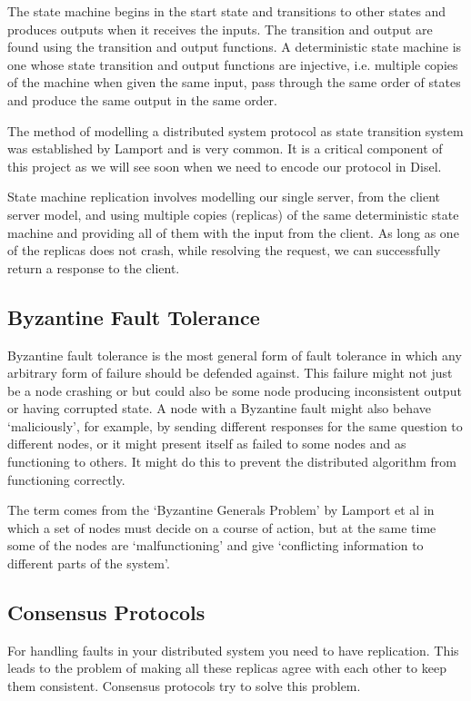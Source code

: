 The state machine begins in the start state and transitions to other states and
produces outputs when it receives the inputs. The transition and output are found
using the transition and output functions. A deterministic state machine is one
whose state transition and output functions are injective, i.e. multiple
copies of the machine when given the same input, pass through the same order of states
and produce the same output in the same order.

The method of modelling a distributed system protocol as state transition system
was established by Lamport \cite{10} and is very common. It is a critical component
of this project as we will see soon when we need to encode our protocol in Disel.

State machine replication involves modelling our single server, from the client
server model, and using multiple copies (replicas) of the same deterministic
state machine and providing all of them with the input from the client.
As long as one of the replicas does not crash, while resolving the request,
we can successfully return a response to the client.

\subsection{Byzantine Fault Tolerance}
Byzantine fault tolerance is the most general form of fault tolerance in which
any arbitrary form of failure should be defended against. This failure might not
just be a node crashing or but could also be some node producing inconsistent
output or having corrupted state. A node with a Byzantine fault might also behave
`maliciously', for example, by sending different responses for the same question to
different nodes, or it might present itself as failed to some nodes and as functioning
to others. It might do this to prevent the distributed algorithm from functioning
correctly.

The term comes from the `Byzantine Generals Problem' by Lamport et al \cite{3}
in which a set of nodes must decide on a course of action, but at the same time
some of the nodes are `malfunctioning' and give `conflicting information to
different parts of the system'.

\subsection{Consensus Protocols}
For handling faults in your distributed system you need to have replication.
This leads to the problem of making all these replicas agree with each other
to keep them consistent. Consensus protocols try to solve this problem.

